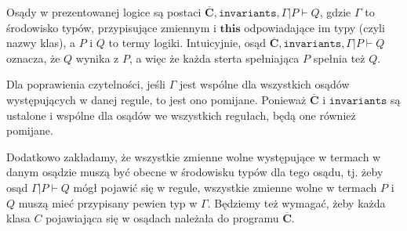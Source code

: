 \documentclass[]{pracamgr}
\renewcommand \| {\hspace{0.75em} | \hspace{0.75em} }
\renewcommand \[ {[\![}
\renewcommand \] {]\!]}
\theoremstyle{definition}
\newcommand{\jthis}{\textbf{this}\xspace}
\begin{document}
Osądy w prezentowanej logice są postaci
$\overline{\mathbf{C}}, \mathtt{invariants}, \Gamma | P \vdash Q$, gdzie $\Gamma$ to środowisko typów,
przypisujące zmiennym i $\jthis$ odpowiadające im typy (czyli nazwy klas), a $P$ i $Q$ to termy logiki.
Intuicyjnie, osąd $\overline{\mathbf{C}}, \mathtt{invariants}, \Gamma | P \vdash Q$
oznacza, że $Q$ wynika z $P$, a więc że każda sterta spełniająca
$P$ spełnia też $Q$.

Dla poprawienia czytelności, jeśli $\Gamma$ jest wspólne dla wszystkich osądów występujących
w danej regule, to jest ono pomijane. Ponieważ $\overline{\mathbf{C}}$ i $\mathtt{invariants}$
są ustalone i wspólne dla osądów we wszystkich regułach, będą one również pomijane.

Dodatkowo zakładamy, że wszystkie zmienne wolne występujące w termach w danym osądzie muszą być
obecne w środowisku typów dla tego osądu, tj. żeby osąd $\Gamma | P \vdash Q$ mógł pojawić się
w regule, wszystkie zmienne wolne w termach $P$ i $Q$ muszą mieć przypisany pewien typ w $\Gamma$.
Będziemy też wymagać, żeby każda klasa $C$ pojawiająca się w osądach należała do programu
\(\overline{\mathbf{C}}\). 
\end{document}
